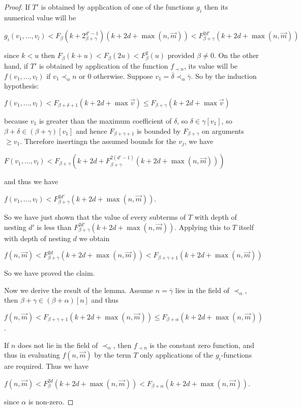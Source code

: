 \documentclass[8pt]{article}
\theoremstyle{definition}
\theoremstyle{definition}
\theoremstyle{definition}
\theoremstyle{definition}
\theoremstyle{definition}
\theoremstyle{definition}
\theoremstyle{definition}
\theoremstyle{definition}
\theoremstyle{definition}
\theoremstyle{definition}
\theoremstyle{definition}
\theoremstyle{definition}
\theoremstyle{definition}
\theoremstyle{question}
\begin{document}
\begin{proof}
  If $T'$ is obtained by application of one of the functions $g_i$ then its numerical value will be
  \begin{center}
    $g_i(v_1, \dots, v_l) < F_{\beta}(k + 2^{d'-1}_{\beta + \gamma})(k + 2 d + \max(n, \vec{m})) < F^{2 d'}_{\beta + \gamma}(k + 2 d + \max(n, \vec{m}))$
  \end{center}
  since $k < u$ then $F_{\beta}(k + u) < F_{\beta}(2 u) < F^2_{\beta}(u)$ provided $\beta \neq 0$. On the other hand,
  if $T'$ is obtained by application of the function $f_{\prec n}$, its value will be $f(v_1, \dots, v_l)$
  if $v_1 \prec_{\alpha} n$ or $0$ otherwise. Suppose $v_1 = \overline{\delta} \prec_{\alpha} \overline{\gamma}$.
  So by the induction hypothesis:
  \begin{center}
    $f(v_1, \dots, v_l) < F_{\beta + \delta + 1}(k + 2 d + \max \vec{v}) \leq F_{\beta + \gamma}(k + 2 d + \max \vec{v})$
  \end{center}
  because $v_1$ is greater than the maximum coefficient of $\delta$, so $\delta \in \gamma[v_1]$, so
  $\beta + \delta \in (\beta + \gamma)[v_1]$ and hence $F_{\beta + \gamma + 1}$ is bounded by $F_{\beta + \gamma}$
  on arguments $\geq v_1$. Therefore insertingn the assumed bounds for the $v_j$, we have
  \begin{center}
    $F(v_1, \dots, v_l) < F_{\beta + \gamma}(k + 2d + F^{2(d' - 1)}_{\beta + \gamma}(k + 2d + \max(n, \vec{m})))$
  \end{center}
  and thus we have
  \begin{center}
    $f(v_1, \dots, v_l) < F^{2d'}_{\beta + \gamma}(k + 2d + \max(n, \vec{m}))$.
  \end{center}
  So we have just shown that the value of every subterms of $T$ with depth of nesting $d'$
  is less than $F^{2d'}_{\beta + \gamma}(k + 2d + \max(n, \vec{m}))$. Applying this to $T$
  itself with depth of nesting $d$ we obtain
  \begin{center}
    $f(n, \vec{m}) < F^{2d}_{\beta + \gamma}(k + 2d + \max(n, \vec{m})) < F_{\beta + \gamma + 1}(k+2d+\max(n,\vec{m}))$
  \end{center}
  So we have proved the claim.

  Now we derive the result of the lemma. Assume $n = \overline{\gamma}$ lies in the field of
  $\prec_{\alpha}$, then $\beta + \gamma \in (\beta + \alpha)[n]$ and thus
  \begin{center}
    $f(n, \vec{m}) < F_{\beta + \gamma + 1}(k + 2d + \max(n, \vec{m})) \leq F_{\beta + \alpha}(k + 2d + \max(n, \vec{m}))$.
  \end{center}

  If $n$ does not lie in the field of $\prec_{\alpha}$, then $f_{\prec n}$ is the constant zero function, and thus
  in evaluating $f(n, \vec{m})$ by the term $T$ only applications of the $g_i$-functions are required.
  Thus we have
  \begin{center}
    $f(n, \vec{m}) < F^{2d}_{\beta}(k + 2d + \max(n, \vec{m})) < F_{\beta + \alpha}(k + 2d + \max(n, \vec{m}))$.
  \end{center}
  since $\alpha$ is non-zero.
\end{proof}
\end{document}
